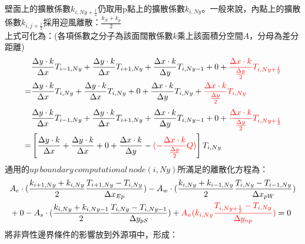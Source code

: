 \documentclass[12pt]{article}
\begin{document}
\noindent 壁面上的擴散係數$k_{i,Ny+\frac{1}{2}}$仍取用p點上的擴散係數$k_{i,Ny}$。一般來說，內點上的擴散係數$k_{i,j+\frac{1}{2}}$採用迎風離散：$\frac{k_{N}+k_{p}}{2}$\\
\noindent 上式可化為：(各項係數之分子為該面闊散係數$k$乘上該面積分空間$A$，分母為差分距離)
\begin{equation}
    \begin{split}
 &\frac{\Delta y   \cdot k}{\Delta x}T_{i-1,Ny}+  \frac{\Delta y \cdot k}{\Delta x}T_{i+1,Ny}+
  \frac{\Delta x   \cdot k }{\Delta y}T_{i,Ny-1}+0  + {\color{red}\frac{\Delta x\cdot k }{\frac{\Delta y}{2}}T_{i,Ny+\frac{1}{2}}}\\
=&\frac{\Delta y   \cdot k }{\Delta x}T_{i,Ny} + \frac{\Delta y \cdot k }{\Delta x}T_{i,Ny} + 0 + \frac{\Delta x \cdot k }{\Delta y}T_{i,Ny} + {\color{red}\frac{\Delta x\cdot k }{\frac{\Delta y}{2}}T_{i,Ny}} \\
\end{split}
\end{equation}
\begin{equation}
    \begin{split}
 &\frac{\Delta y   \cdot k}{\Delta x}T_{i-1,Ny}+  \frac{\Delta y \cdot k}{\Delta x}T_{i+1,Ny}+
 \frac{\Delta x   \cdot k }{\Delta y}T_{i,Ny-1} + 0 + {\color{red}\frac{\Delta x\cdot k }{\frac{\Delta y}{2}}T_{i,Ny+\frac{1}{2}}}\\
=&\left[\frac{\Delta y   \cdot k }{\Delta x}+ \frac{\Delta y \cdot k }{\Delta x} + 0 + \frac{\Delta x   \cdot k }{\Delta y} - {\color{red}(-\frac{\Delta x\cdot k }{\frac{\Delta y}{2}}Q)} \right]T_{i,Ny}\\
\end{split}
\end{equation}
\newpage
\noindent 通用的$up\,boundary\,computational\,node (i,Ny)$所滿足的離散化方程為：\\
\begin{equation}
    \begin{split}
 &A_{e}  \cdot  (\frac{k_{i+1,Ny}+k_{i,Ny}}{2} \frac{T_{i+1,Ny}-T_{i,Ny}}{\Delta x_{Ep}})- A_{w}  \cdot  (\frac{k_{i,Ny}+k_{i-1,Ny}}{2} \frac{T_{i,Ny}-T_{i-1,Ny}}{\Delta x_{pW}})\\
 &+0- A_{s}  \cdot(  \frac{k_{i,Ny}+k_{i,Ny-1}}{2} \frac{T_{i,Ny}-T_{i,Ny-1}}{\Delta y_{pS}}) + {\color{red}A_{n}(k_{i,Ny}\frac{T_{i,Ny+\frac{1}{2}}-T_{i,Ny}}{\Delta y_{np}})}= 0\\
\end{split}
\end{equation}
\noindent 將非齊性邊界條件的影響放到外源項中，形成：
\end{document}
